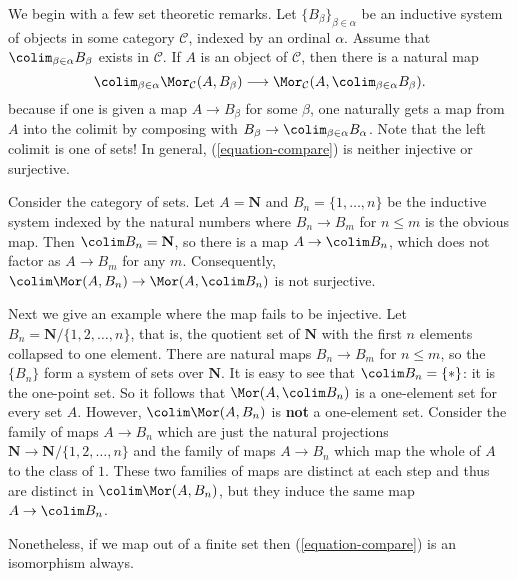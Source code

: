 \medskip\noindent
We begin with a few set theoretic remarks.
Let $\{B_{\beta}\}_{\beta \in \alpha}$ be an inductive system of
objects in some category $\mathcal{C}$, indexed by
an ordinal $\alpha$. Assume that $\colim_{\beta \in \alpha} B_\beta$
exists in $\mathcal{C}$. If $A$ is an object of $\mathcal{C}$, then there is a
natural map
\begin{equation}
\label{equation-compare}
\colim_{\beta \in \alpha} \Mor_\mathcal{C}(A, B_\beta)
\longrightarrow
\Mor_\mathcal{C}(A, \colim_{\beta \in \alpha} B_\beta).
\end{equation}
because if one is given a map $A \to B_\beta$ for some $\beta$, one
naturally gets a map from $A$  into the colimit by composing with
$B_\beta \to \colim_{\beta \in \alpha} B_\alpha$.
Note that the left colimit is one of sets! In general, (\ref{equation-compare})
is neither injective or surjective.

\begin{example}
\label{example-not-surjective}
Consider the category of sets. Let $A = \mathbf{N}$ and
$B_n = \{1, \ldots, n\}$ be the inductive system indexed by the natural numbers
where $B_n \to B_m$ for $n \leq m$ is the obvious map. Then
$\colim B_n = \mathbf{N}$, so there is a map
$A \to \colim B_n$, which does not factor as $A \to B_m$
for any $m$. Consequently,
$\colim \Mor(A, B_n) \to \Mor(A, \colim B_n)$
is not surjective.
\end{example}

\begin{example}
\label{example-not-injective}
Next we give an example where the map fails to be injective. Let $B_n =
\mathbf{N}/\{1,  2, \ldots, n\}$, that is, the quotient set of
$\mathbf{N}$ with the first $n$ elements collapsed to one element.
There are natural maps $B_n \to B_m$ for $n \leq m$, so the
$\{B_n\}$ form a system of sets over $\mathbf{N}$. It is easy to see that
$\colim B_n = \{*\}$: it is the one-point set.
So it follows that $\Mor(A, \colim B_n)$ is a one-element set
for every set $A$.
However, $\colim \Mor(A , B_n)$ is {\bf not} a one-element set.
Consider the family of maps $A \to B_n$ which are just the natural projections
$\mathbf{N} \to \mathbf{N}/\{1, 2, \ldots, n\}$ and the family of
maps $A \to B_n$ which map the whole of $A$ to the class of $1$.
These two families of maps are distinct at each step and thus are distinct in
$\colim \Mor(A, B_n)$, but they induce the same map
$A \to \colim B_n$.
\end{example}

\noindent
Nonetheless, if we map out of a finite set then
(\ref{equation-compare}) is an isomorphism always.


